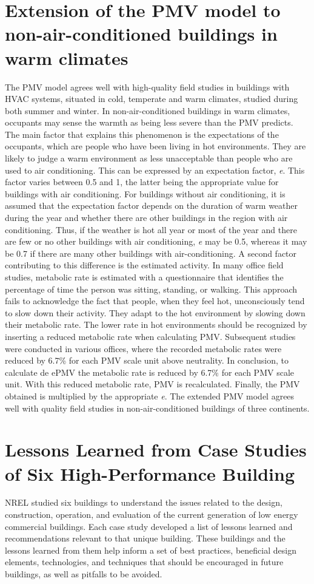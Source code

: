 \section{Extension of the PMV model to non-air-conditioned buildings in warm climates}
The PMV model agrees well with high-quality field studies in buildings with HVAC systems, situated in cold, temperate and warm climates, studied during both summer and winter. In non-air-conditioned buildings in warm climates, occupants may sense the warmth as being less severe than the PMV predicts. The main factor that explains this phenomenon is the expectations of the occupants, which are people who have been living in hot environments. They are likely to judge a warm environment as less unacceptable than people who are used to air conditioning. This can be expressed by an expectation factor, \textit{e}. This factor varies between 0.5 and 1, the latter being the appropriate value for buildings with air conditioning. For buildings without air conditioning, it is assumed that the expectation factor depends on the duration of warm weather during the year and whether there are other buildings in the region with air conditioning. Thus, if the weather is hot all year or most of the year and there are few or no other buildings with air conditioning, \textit{e} may be 0.5, whereas it may be 0.7 if there are many other buildings with air-conditioning. A second factor contributing to this difference is the estimated activity. In many office field studies, metabolic rate is estimated with a questionnaire that identifies the percentage of time the person was sitting, standing, or walking. This approach fails to acknowledge the fact that people, when they feel hot, unconsciously tend to slow down their activity. They adapt to the hot environment by slowing down their metabolic rate. The lower rate in hot environments should be recognized by inserting a reduced metabolic rate when calculating PMV. Subsequent studies were conducted in various offices, where the recorded metabolic rates were reduced by 6.7\% for each PMV scale unit above neutrality. In conclusion, to calculate de ePMV the metabolic rate is reduced by 6.7\% for each PMV scale unit. With this reduced metabolic rate, PMV is recalculated. Finally, the PMV obtained is multiplied by the appropriate \textit{e}. The extended PMV model agrees well with quality field studies in non-air-conditioned buildings of three continents.

\newpage

\section{Lessons Learned from Case Studies of Six High-Performance Building}
NREL studied six buildings to understand the issues related to the design, construction, operation, and evaluation of the current generation of low energy commercial buildings. Each case study developed a list of lessons learned and recommendations relevant to that unique building. These buildings and the lessons learned from them help inform a set of best practices, beneficial design elements, technologies, and techniques that should be encouraged in future buildings, as well as pitfalls to be avoided. 

